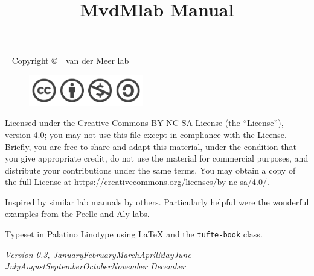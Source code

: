 \documentclass{tufte-book}
\title{MvdMlab Manual}
\newcommand{\monthyear}{%
  \ifcase\month\or January\or February\or March\or April\or May\or June\or
  July\or August\or September\or October\or November\or
  December\fi\space\number\year
}
\newcommand{\openepigraph}[2]{%
  \begin{fullwidth}
  \sffamily\large
  \begin{doublespace}
  \noindent\allcaps{#1}\\%
  \noindent\allcaps{#2}%
  \end{doublespace}
  \end{fullwidth}
}
\newcommand{\blankpage}{\newpage\hbox{}\thispagestyle{empty}\newpage}
\newcommand{\doccls}[1]{\texttt{#1}}%
\begin{document}



\maketitle

\newpage
\begin{fullwidth}
~\vfill
\thispagestyle{empty}
\setlength{\parindent}{0pt}
\setlength{\parskip}{\baselineskip}
Copyright \copyright\ \the\year\ van der Meer lab

\par{}

\begin{figure}
  \includegraphics[width=5cm]{images/license.png}
\end{figure}


\par Licensed under the Creative Commons BY-NC-SA License (the
``License''), version 4.0; you may not use this file except in
compliance with the License. Briefly, you are free to share and adapt
this material, under the condition that you give appropriate credit,
do not use the material for commercial purposes, and distribute your
contributions under the same terms. You may obtain a copy of the full
License at \url{https://creativecommons.org/licenses/by-nc-sa/4.0/}.

\par Inspired by similar lab manuals by others. Particularly helpful
were the wonderful examples from the
\href{http://jpeelle.net/peellelab_manual.pdf}{Peelle} and \href{https://github.com/alylab/labmanual}{Aly} labs.

\par Typeset in Palatino Linotype using \LaTeX{} and the
\doccls{tufte-book} class.

\par\textit{Version 0.3, \monthyear}
\end{fullwidth}
\end{document}
